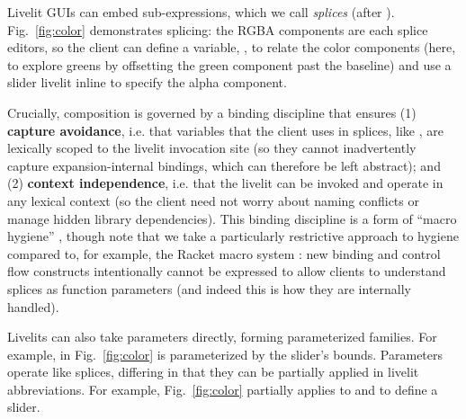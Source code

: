 %
   Livelit GUIs can embed sub-expressions, which we call \emph{splices} (after
   \citet{TLMs}).
  Fig.~\ref{fig:color} demonstrates splicing: the RGBA components  
  are each splice editors, so the client can define a variable, ,
  to relate the color components (here, to explore greens by offsetting the green component past the baseline)
  and use a slider livelit inline to specify the alpha component.
  
  Crucially, composition is  
  governed by a binding discipline that ensures 
  (1) \textbf{capture avoidance}, i.e. that variables that the client uses in splices, like ,  
  are lexically scoped to the livelit invocation site (so they cannot inadvertently capture expansion-internal bindings, which can therefore be left abstract); and 
  (2) \textbf{context independence}, i.e. that the livelit 
  can be invoked and operate in any lexical context (so the client need not worry about naming conflicts or manage hidden library dependencies).
  This binding discipline is a form of ``macro hygiene'' \cite{TLMs, adamsHygiene, DBLP:conf/popl/ClingerR91}, 
  though note that we take a particularly restrictive approach to hygiene compared to, for example, the Racket macro system \cite{DBLP:conf/popl/Flatt16}: 
  new binding and control flow constructs intentionally cannot be expressed to allow clients to understand splices as   
  function parameters (and indeed this is how they are internally handled).


 Livelits can also take parameters directly, forming parameterized families.
  For example,  in Fig.~\ref{fig:color} is parameterized by the slider's bounds.
  Parameters operate like splices, differing in that they can be partially applied in
  livelit abbreviations. For example, Fig.~\ref{fig:color}
  partially applies  to  and  to define a  slider.


